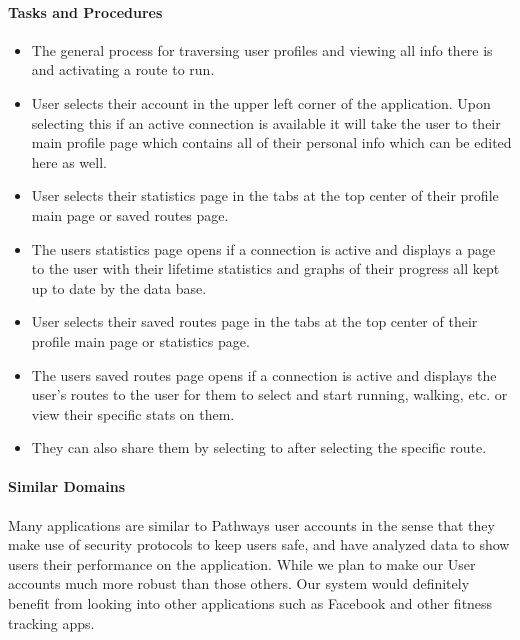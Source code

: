\documentclass{article}
\begin{document}
\paragraph{Tasks and Procedures}
\begin{itemize}
    \item The general process for traversing user profiles and viewing all info there is and activating a route to run.
    \item User selects their account in the upper left corner of the application.
    \subitem Upon selecting this if an active connection is available it will take the user to their main profile page which contains all of their personal info which can be edited here as well.
    \item User selects their statistics page in the tabs at the top center of their profile main page or saved routes page.
    \item The users statistics page opens if a connection is active and displays a page to the user with their lifetime statistics and graphs of their progress all kept up to date by the data base.
    \item User selects their saved routes page in the tabs at the top center of their profile main page or statistics page.
    \item The users saved routes page opens if a connection is active and displays the user's routes to the user for them to select and start running, walking, etc. or view their specific stats on them.
    \item They can also share them by selecting to after selecting the specific route.
\end{itemize}

\paragraph{Similar Domains}
Many applications are similar to Pathways user accounts in the sense that they make use of security protocols to keep users safe, and have analyzed data to show users their performance on the application. While we plan to make our User accounts much more robust than those others. Our system would definitely benefit from looking into other applications such as Facebook and other fitness tracking apps.
\end{document}
